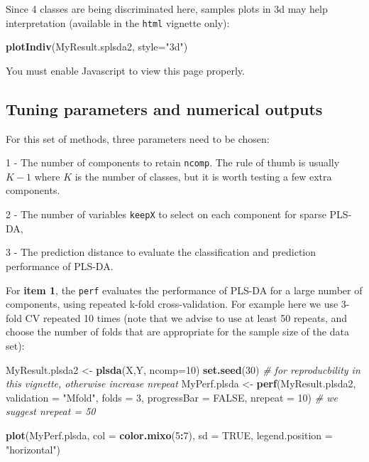 \documentclass[]{book}
\newenvironment{Shaded}{\begin{snugshade}}{\end{snugshade}}
\newcommand{\CommentTok}[1]{\textcolor[rgb]{0.56,0.35,0.01}{\textit{#1}}}
\newcommand{\DataTypeTok}[1]{\textcolor[rgb]{0.13,0.29,0.53}{#1}}
\newcommand{\DecValTok}[1]{\textcolor[rgb]{0.00,0.00,0.81}{#1}}
\newcommand{\KeywordTok}[1]{\textcolor[rgb]{0.13,0.29,0.53}{\textbf{#1}}}
\newcommand{\NormalTok}[1]{#1}
\newcommand{\OperatorTok}[1]{\textcolor[rgb]{0.81,0.36,0.00}{\textbf{#1}}}
\newcommand{\OtherTok}[1]{\textcolor[rgb]{0.56,0.35,0.01}{#1}}
\newcommand{\StringTok}[1]{\textcolor[rgb]{0.31,0.60,0.02}{#1}}
\begin{document}
Since 4 classes are being discriminated here, samples plots in 3d may help interpretation (available in the \texttt{html} vignette only):

\begin{Shaded}
\begin{Highlighting}[]
\KeywordTok{plotIndiv}\NormalTok{(MyResult.splsda2, }\DataTypeTok{style=}\StringTok{"3d"}\NormalTok{)}
\end{Highlighting}
\end{Shaded}

\hypertarget{_04_splsda_3ddiv}{}

You must enable Javascript to view this page properly.

\hypertarget{tuning:sPLSDA}{%
\subsection{Tuning parameters and numerical outputs}\label{tuning:sPLSDA}}

For this set of methods, three parameters need to be chosen:

1 - The number of components to retain \texttt{ncomp}. The rule of thumb is usually \(K - 1\) where \(K\) is the number of classes, but it is worth testing a few extra components.

2 - The number of variables \texttt{keepX} to select on each component for sparse PLS-DA,

3 - The prediction distance to evaluate the classification and prediction performance of PLS-DA.

For \textbf{item 1}, the \texttt{perf} evaluates the performance of PLS-DA for a large number of components, using repeated k-fold cross-validation. For example here we use 3-fold CV repeated 10 times (note that we advise to use at least 50 repeats, and choose the number of folds that are appropriate for the sample size of the data set):

\begin{Shaded}
\begin{Highlighting}[]
\NormalTok{MyResult.plsda2 <-}\StringTok{ }\KeywordTok{plsda}\NormalTok{(X,Y, }\DataTypeTok{ncomp=}\DecValTok{10}\NormalTok{)}
\KeywordTok{set.seed}\NormalTok{(}\DecValTok{30}\NormalTok{) }\CommentTok{# for reproducbility in this vignette, otherwise increase nrepeat}
\NormalTok{MyPerf.plsda <-}\StringTok{ }\KeywordTok{perf}\NormalTok{(MyResult.plsda2, }\DataTypeTok{validation =} \StringTok{"Mfold"}\NormalTok{, }\DataTypeTok{folds =} \DecValTok{3}\NormalTok{, }
                  \DataTypeTok{progressBar =} \OtherTok{FALSE}\NormalTok{, }\DataTypeTok{nrepeat =} \DecValTok{10}\NormalTok{) }\CommentTok{# we suggest nrepeat = 50}

\KeywordTok{plot}\NormalTok{(MyPerf.plsda, }\DataTypeTok{col =} \KeywordTok{color.mixo}\NormalTok{(}\DecValTok{5}\OperatorTok{:}\DecValTok{7}\NormalTok{), }\DataTypeTok{sd =} \OtherTok{TRUE}\NormalTok{, }\DataTypeTok{legend.position =} \StringTok{"horizontal"}\NormalTok{)}
\end{Highlighting}
\end{Shaded}
\end{document}
